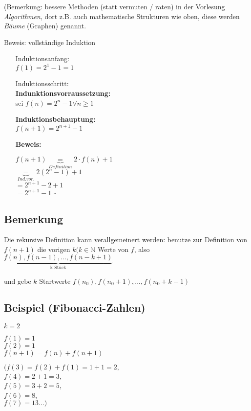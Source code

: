 \documentclass[a4paper, 12pt, twoside] {article}
\begin{document}
\begin{description}
(Bemerkung: bessere Methoden (statt vermuten / raten) in der Vorlesung \textit{Algorithmen}, dort z.B. auch mathematische Strukturen wie oben, diese werden \textit{Bäume} (Graphen) genannt.

Beweis: vollständige Induktion

\begin{itemize}
\item[Induktionsanfang:] \hfill \\
$f(1) = 2^1 -1 = 1$

\item[Induktionsschritt:] \hfill \\
\textbf{Indunktionsvorraussetzung:} \\
sei $f(n) = 2^n - 1 \forall n \geq 1$

\textbf{Induktionsbehauptung:} \\
$f(n+1) = 2^{n+1} -1$

\textbf{Beweis:}

$f(n+1) \underbrace{=}_{Definition} 2 \cdot f(n) + 1$ \\
$\underbrace{=}_{Ind. vor.} 2 (2^n -1) +1$ \\
$= 2^{n+1} - 2 + 1$ \\
$= 2^{n+1} - 1$ \hfill $\square$

\end{itemize}

\end{description}

\subsection{Bemerkung} %
Die rekursive Definition kann verallgemeinert werden: benutze zur Definition von $f(n+1)$ die vorigen $k(k \in \mathbb{N}$ Werte von $f$, also $\underbrace{f(n), f(n-1), ..., f(n-k+1)}_{\text{k Stück}}$

und gebe $k$ Startwerte $f(n_0), f(n_0 + 1), ..., f(n_0 + k - 1)$

\subsection{Beispiel (Fibonacci-Zahlen)} %
$k = 2$

$f(1) = 1$ \\
$f(2) = 1$ \\
$f(n+1) = f(n) + f(n+1)$

$(f(3) = f(2) + f(1) = 1 + 1 = 2,$ \\
$f(4) = 2 + 1 = 3$, \\
$f(5) = 3 + 2 = 5$, \\
$f(6) = 8$, \\
$f(7) = 13...)$
\end{document}
